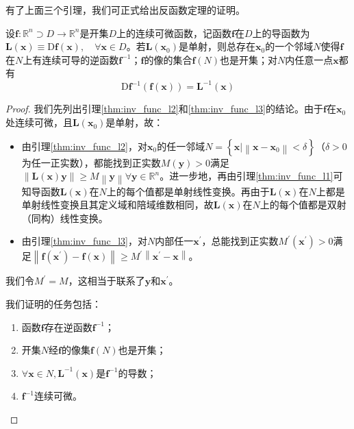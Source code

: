 \documentclass[../main.tex]{subfiles}
\begin{document}
有了上面三个引理，我们可正式给出反函数定理的证明。
\begin{theorem}[反函数定理]
    设$\mathbf{f}:\mathbb{R}^n\supset D\rightarrow\mathbb{R}^n$是开集$D$上的连续可微函数，记函数$\mathbf{f}$在$D$上的导函数为$\mathbf{L}\left(\mathbf{x}\right)\equiv\mathrm{D}\mathbf{f}\left(\mathbf{x}\right),\quad\forall\mathbf{x}\in D$。若$\mathbf{L}\left(\mathbf{x}_0\right)$是单射，则总存在$\mathbf{x}_0$的一个邻域$N$使得$\mathbf{f}$在$N$上有连续可导的逆函数$\mathbf{f}^{-1}$；$\mathbf{f}$的像的集合$\mathbf{f}\left(N\right)$也是开集；对$N$内任意一点$\mathbf{x}$都有
    \[
        \mathrm{D}\mathbf{f}^{-1}\left(\mathbf{f}\left(\mathbf{x}\right)\right)=\mathbf{L}^{-1}\left(\mathbf{x}\right)
    \]
\end{theorem}
\begin{proof}
    我们先列出引理\ref{thm:inv_func_l2}和\ref{thm:inv_func_l3}的结论。由于$\mathbf{f}$在$\mathbf{x}_0$处连续可微，且$\mathbf{L}\left(\mathbf{x}_0\right)$是单射，故：
    \begin{itemize}
        \item 由引理\ref{thm:inv_func_l2}，对$\mathbf{x}_0$的任一邻域$N=\left\{\mathbf{x}|\left\|\mathbf{x}-\mathbf{x}_0\right\|<\delta\right\}$（$\delta>0$为任一正实数），都能找到正实数$M\left(\mathbf{y}\right)>0$满足$\left\|\mathbf{L}\left(\mathbf{x}\right)\mathbf{y}\right\|\geq M\left\|\mathbf{y}\right\|\forall\mathbf{y}\in\mathbb{R}^n$。进一步地，再由引理\ref{thm:inv_func_l1}可知导函数$\mathbf{L}\left(\mathbf{x}\right)$在$N$上的每个值都是单射线性变换。再由于$\mathbf{L}\left(\mathbf{x}\right)$在$N$上都是单射线性变换且其定义域和陪域维数相同，故$\mathbf{L}\left(\mathbf{x}\right)$在$N$上的每个值都是双射（同构）线性变换。
        \item 由引理\ref{thm:inv_func_l3}，对$N$内部任一$\mathbf{x}^\prime$，总能找到正实数$M^\prime\left(\mathbf{x}^\prime\right)>0$满足$\left\|\mathbf{f}\left(\mathbf{x}^\prime\right)-\mathbf{f}\left(\mathbf{x}\right)\right\|\geq M^\prime\left\|\mathbf{x}^\prime-\mathbf{x}\right\|$。
    \end{itemize}
    我们令$M^\prime=M$，这相当于联系了$\mathbf{y}$和$\mathbf{x}^\prime$。

    我们证明的任务包括：
    \begin{enumerate}[label=\Roman*]
        \item\label{thm:inv_func_sub1} 函数$\mathbf{f}$存在逆函数$\mathbf{f}^{-1}$；
        \item\label{thm:inv_func_sub2} 开集$N$经$\mathbf{f}$的像集$\mathbf{f}\left(N\right)$也是开集；
        \item\label{thm:inv_func_sub3} $\forall \mathbf{x}\in N,\mathbf{L}^{-1}\left(\mathbf{x}\right)$是$\mathbf{f}^{-1}$的导数；
        \item\label{thm:inv_func_sub4} $\mathbf{f}^{-1}$连续可微。
    \end{enumerate}


\end{proof}
\end{document}
